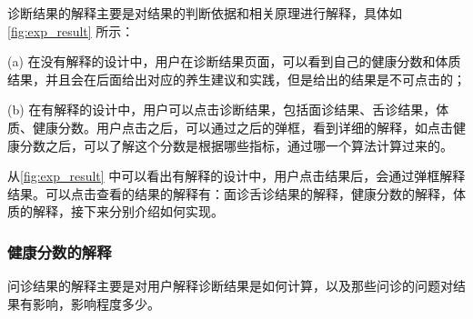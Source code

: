 诊断结果的解释主要是对结果的判断依据和相关原理进行解释，具体如 \ref{fig:exp_result} 所示：

(a) 在没有解释的设计中，用户在诊断结果页面，可以看到自己的健康分数和体质结果，并且会在后面给出对应的养生建议和实践，但是给出的结果是不可点击的；

(b) 在有解释的设计中，用户可以点击诊断结果，包括面诊结果、舌诊结果，体质、健康分数。用户点击之后，可以通过之后的弹框，看到详细的解释，如点击健康分数之后，可以了解这个分数是根据哪些指标，通过哪一个算法计算过来的。

从\ref{fig:exp_result} 中可以看出有解释的设计中，用户点击结果后，会通过弹框解释结果。可以点击查看的结果的解释有：面诊舌诊结果的解释，健康分数的解释，体质的解释，接下来分别介绍如何实现。



\subsubsection{健康分数的解释}
问诊结果的解释主要是对用户解释诊断结果是如何计算，以及那些问诊的问题对结果有影响，影响程度多少。

